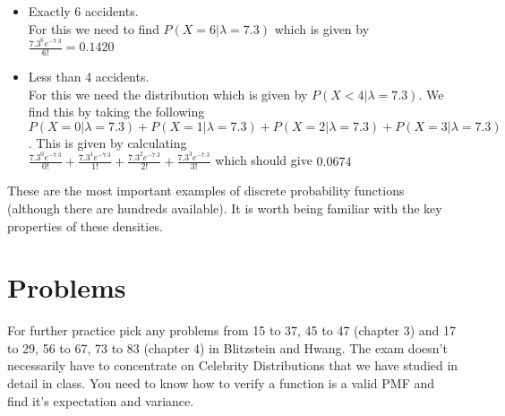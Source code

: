 \documentclass[12pt]{extbook}
\begin{document}
\begin{itemize}
\item Exactly 6 accidents.\\ For this we need to find $P(X=6|\lambda=7.3)$ which is given by $ \frac{7.3^6e^{-7.3}}{6!} = 0.1420$
\item Less than 4 accidents.\\ For this we need the distribution which is given by  $P(X < 4 |\lambda=7.3)$.   We find this by taking the following\\ $ P(X =0 |\lambda=7.3) + P(X = 1 |\lambda=7.3) + P(X =2  |\lambda=7.3) + P(X =3|\lambda=7.3)$.   This is given by calculating\\ $\frac{7.3^0e^{-7.3}}{0!} + \frac{7.3^1e^{-7.3}}{1!} + \frac{7.3^2e^{-7.3}}{2!} + \frac{7.3^3e^{-7.3}}{3!}$ which should give $0.0674$
\end{itemize}





These are the most important examples of discrete probability functions (although there are hundreds available).   It is worth being familiar with the key properties of these densities.



\section{Problems}

\begin{enumerate}












\end{enumerate}


For further practice pick any problems from 15 to 37, 45 to 47 (chapter 3) and 17 to 29, 56 to 67, 73 to 83 (chapter 4) in Blitzstein and Hwang.   The exam doesn't necessarily have to concentrate on Celebrity Distributions that we have studied in detail in class.   You need to know how to verify a function is a valid PMF and find it's expectation and variance.
\end{document}
